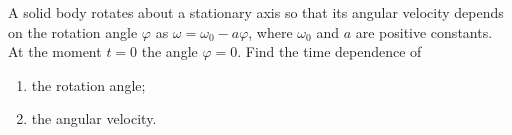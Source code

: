 \item A solid body rotates about a stationary axis so that its angular velocity depends on the rotation angle $\varphi$ as $\omega = \omega_0 - a\varphi$, where $\omega_0$ and $a$ are positive constants. At the moment $t = 0$ the angle $\varphi = 0$. Find the time dependence of
    \begin{enumerate}
        \item the rotation angle;
        \item the angular velocity.
    \end{enumerate}